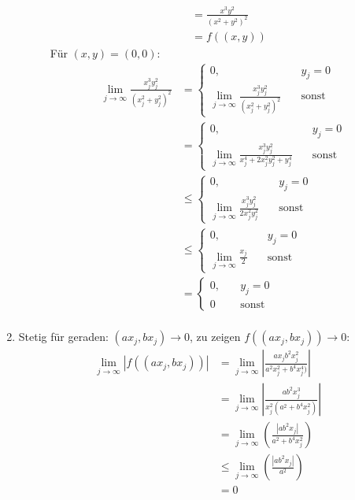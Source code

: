 \documentclass[sectionformat=aufgabe]{gadsescript}
\begin{document}
\begin{enumerate}[label=(\alph*)]
\begin{description}
\begin{align*}
					~ &= \frac{ x^3y^2 }{ ( x^2 + y^2 )^2 } \\
					~ &= f((x, y))
				\end{align*}
				Für $ (x, y) = (0,0) $:
				\begin{align*}
					\lim_{j \to \infty} \frac{ x_j^3y_j^2 }{ (x_j^2 + y_j^2)^2 } &= \begin{cases}
						0, & \quad y_j = 0 \\
						\lim_{j \to \infty} \frac{ x_j^3y_j^2 }{ (x_j^2 + y_j^2)^2 } & \quad \text{sonst} 
					\end{cases}\\
					&= \begin{cases}
						0, & \quad y_j = 0 \\
						\lim_{j \to \infty} \frac{ x_j^3y_j^2 }{ x_j^4 + 2x_j^2y_j^2 + y_j^4 } & \quad \text{sonst} 
					\end{cases}\\
					&\leq \begin{cases}
						0, & \quad y_j = 0 \\
						\lim_{j \to \infty} \frac{ x_j^3y_j^2 }{ 2x_j^2y_j^2 } & \quad \text{sonst} 
					\end{cases} \\
					&\leq \begin{cases}
						0, & \quad y_j = 0 \\
						\lim_{j \to \infty} \frac{ x_j }{ 2 } & \quad \text{sonst} 
					\end{cases} \\
					&= \begin{cases}
						0, & \quad y_j = 0 \\
						0 & \quad \text{sonst} 
					\end{cases} \\
				\end{align*}
		\end{description}
		
	\item Stetig für geraden: $ (ax_j, bx_j) \to 0 $, zu zeigen $ f((ax_j, bx_j)) \to 0 $:
		\begin{align*}
			\lim_{j \to \infty} | f((ax_j, bx_j)) | &= %
			\lim_{j \to \infty} \left| \frac{ax_jb^2x_j^2}{ a^2x_j^2 + b^4x_j^4) } \right| \\
			~ &=\lim_{j \to \infty} \left| \frac{ab^2x_j^3}{ x_j^2(a^2 + b^4x_j^2) } \right| \\
			~ &=\lim_{j \to \infty} \left( \frac{ \left| ab^2x_j \right| }{ a^2 + b^4x_j^2 } \right) \\
			~ &\leq \lim_{j \to \infty} \left( \frac{ \left| ab^2x_j \right| }{ a^2 } \right) \\
			&= 0 \\
		\end{align*}


\end{enumerate}
\end{document}
